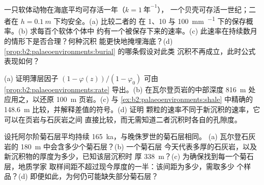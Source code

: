 \begin{exercise}[$\star\star\star$]\label{exo:b2:palaeoenvironments:10}
一只软体动物在海底平均可存活一年（$k = \qty{1}{\text{年}^{-1}}$），
一个贝壳可存活一世纪；二者在 $h = \qty{0.1}{m}$ 下均安全。(a) 比较二者的
在 1、10 与 \qty{100}{mm.^{-1}} 下的保存概率。(b) 求每百个软体个体中
约有一个被保存下来的速率。(c) 此速率在持续数月的情形下是否合理？何种沉积
能更快地掩埋海底？(d) \cref{prop:b2:palaeoenvironments:burial} 的哪条假设对此类
沉积不再成立，此时公式表现如何？
\end{exercise}

\begin{exercise}[$\star\star\star$]\label{exo:b2:palaeoenvironments:11}
(a) 证明薄层因子 $(1 - \varphi(z))/(1 - \varphi_0)$ 可由
\cref{prop:b2:palaeoenvironments:rate} 导出。(b) 在瓦尔登页岩的中部深度
\qty{816}{m} 处应用之，以还原 \qty{100}{m} 页岩。(c) 与
\cref{ex:b2:palaeoenvironments:shale} 中精确的 \qty{148.6}{m} 比较，并解释差值的符号。(d) 证明
颗粒的速率不同于新沉积的速率，它可以在页岩与石灰岩之间
直接比较，而无需知道二者沉积时各自的孔隙度。
\end{exercise}

\begin{exercise}[$\star\star\star$]\label{exo:b2:palaeoenvironments:12}
设托阿尔阶菊石层平均持续 \qty{165}{ka}，与晚侏罗世的菊石层相同。
(a) 瓦尔登石灰岩的 \qty{180}{m} 中会含多少个菊石层？(b) 一个菊石层
今天代表多厚的石灰岩，以及新沉积物的厚度为多少，已知该层沉积时
厚 \qty{338}{m}？(c) 为确保找到每一个菊石层，地质学家
取样间距不超过现今厚度的一半：该间距为多少，需取多少
个样品？(d) 即便如此，为何仍可能缺失部分菊石层？
\end{exercise}

